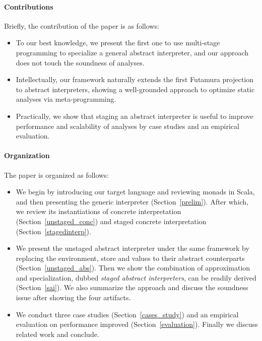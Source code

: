 \paragraph{Contributions} Briefly, the contribution of the paper is as follows:
\begin{itemize}[leftmargin=2em]
  \item To our best knowledge, we present the first one to use
    multi-stage programming to specialize a general abstract interpreter,
    and our approach does not touch the soundness of analyses.
  \item Intellectually, our framework naturally extends the first
    Futamura projection to abstract interpreters, showing a
    well-grounded approach to optimize static analyses via
    meta-programming.
  \item Practically, we show that staging an abstract interpreter is
    useful to improve performance and scalability of analyses by case
    studies and an empirical evaluation.
\end{itemize}

\paragraph{Organization} The paper is organized as follows:
\begin{itemize}[leftmargin=2em]
  \item We begin by introducing our target language and reviewing
    monads in Scala, and then presenting the generic interpreter
    (Section~\ref{prelim}).  After which, we review its instantiations
    of concrete interpretation (Section~\ref{unstaged_conc}) and
    staged concrete interpretation (Section~\ref{stagedinterp}).
  \item We present the unstaged abstract interpreter under the same
    framework by replacing the environment, store and values to their
    abstract counterparts (Section~\ref{unstaged_abs}). Then we
    show the combination of approximation and specialization, dubbed
    \textit{staged abstract interpreters}, can be readily derived
    (Section~\ref{sai}). We also summarize the approach and discuss
    the soundness issue after showing the four artifacts.
  \item We conduct three case studies (Section~\ref{cases_study}) and
    an empirical evaluation on performance improved (Section~\ref{evaluation}).
    Finally we discuss related work and conclude.
\end{itemize}

\iffalse
On the other side, static analysis is a trade-off between performance and
precision: higher precision usually leads to longer running time.

4. Existing method to improve the performance is adhoc, engineering heavy, require to rewrite the optimized version, therefore harder to reason about the correctness
6. program analyzers are also meta-programs, they manipulate other programs as data objects
\fi
